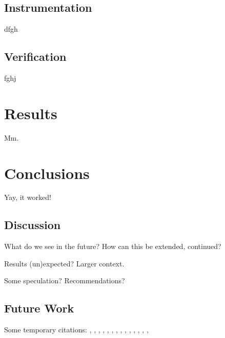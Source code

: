 \documentclass[a4paper,11pt]{kth-mag}
\begin{document}
\section{Instrumentation}

dfgh

\section{Verification}

fghj





\pagestyle{newchap}
\chapter{Results} \label{chapter-results}

Mm.





\pagestyle{newchap}
\chapter{Conclusions}
Yay, it worked!


\section{Discussion}

What do we see in the future? How can this be extended, continued?

Results (un)expected? Larger context.

Some speculation? Recommendations?

\section{Future Work}


Some temporary citations:
\cite{hoare69}, \cite{floyd67}, \cite{pnueli77}, \cite{leucker09abriefaccount},
\cite{bauer06monitoring}, \cite{bauer08goodbadugly}, \cite{delgado04taxonomy},
\cite{meyer92applyingdbc}, \cite{rosenblum95practicalassertions},
\cite{bartetzko01jass}, \cite{bodden04lightweightltl},
\cite{bodden05efficientrv}, \cite{becksmalltalktesting}, \cite{fowlerxunit},
\cite{matusiak09aoppy}












\end{document}
